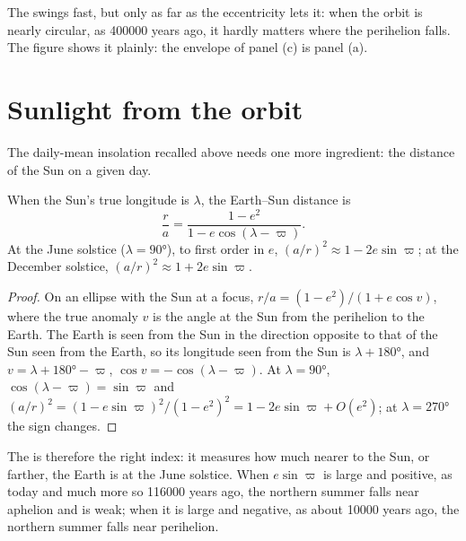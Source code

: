 The  swings fast, but only as far as the eccentricity lets it: when the orbit is
nearly circular, as \num{400000} years ago, it hardly matters where the perihelion falls. The
figure shows it plainly: the envelope of panel (c) is panel (a).

\section{Sunlight from the orbit}\label{sec:b2:orbital-forcing:insolation}

The daily-mean insolation recalled above needs one more ingredient: the distance of the Sun on a
given day.

\begin{proposition}\label{prop:b2:orbital-forcing:distance}
When the Sun's true longitude is $\lambda$, the Earth--Sun distance is
\[
  \frac{r}{a} = \frac{1 - e^2}{1 - e\cos(\lambda - \varpi)} .
\]
At the June solstice ($\lambda = \ang{90}$), to first order in $e$,
$(a/r)^2 \approx 1 - 2e\sin\varpi$; at the December solstice, $(a/r)^2 \approx 1 + 2e\sin\varpi$.
\end{proposition}

\begin{proof}
On an ellipse with the Sun at a focus, $r/a = (1 - e^2)/(1 + e\cos v)$, where the true anomaly $v$
is the angle at the Sun from the perihelion to the Earth. The Earth is seen from the Sun in the
direction opposite to that of the Sun seen from the Earth, so its longitude seen from the Sun is
$\lambda + \ang{180}$, and $v = \lambda + \ang{180} - \varpi$, $\cos v = -\cos(\lambda - \varpi)$.
At $\lambda = \ang{90}$, $\cos(\lambda - \varpi) = \sin\varpi$ and $(a/r)^2 = (1 -
e\sin\varpi)^2/(1 - e^2)^2 = 1 - 2e\sin\varpi + O(e^2)$; at $\lambda = \ang{270}$ the sign changes.
\end{proof}

The  is therefore the right index: it measures how much nearer to the Sun, or
farther, the Earth is at the June solstice. When $e\sin\varpi$ is large and positive, as today and
much more so \num{116000} years ago, the northern summer falls near aphelion and is weak; when it is
large and negative, as about \num{10000} years ago, the northern summer falls near perihelion.


